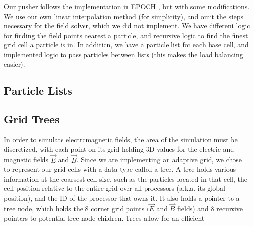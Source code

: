 \documentclass[]{article}
\begin{document}
\begin{figure}[htbp]
\label{fig:boris}
\end{figure}

Our pusher follows the implementation in EPOCH \cite{epoch}, but with some modifications.  We use our own linear interpolation method (for simplicity), and omit the steps necessary for the field solver, which we did not implement.  We have different logic for finding the field points nearest a particle, and recursive logic to find the finest grid cell a particle is in.  In addition, we have a particle list for each base cell, and implemented logic to pass particles between lists (this makes the load balancing easier).

\subsection{Particle Lists}

\subsection{Grid Trees}
In order to simulate electromagnetic fields, the area of the simulation must be discretized, with each point on its grid holding 3D values for the electric and magnetic fields $\vec{E}$ and $\vec{B}$. Since we are implementing an adaptive grid, we chose to represent our grid cells with a data type called a tree. A tree holds various information at the coarsest cell size, such as the particles located in that cell, the cell position relative to the entire grid over all processors (a.k.a. its global position), and the ID of the processor that owns it. It also holds a pointer to a tree node, which holds the 8 corner grid points ($\vec{E}$ and $\vec{B}$ fields) and 8 recursive pointers to potential tree node children. Trees allow for an efficient
\end{document}
